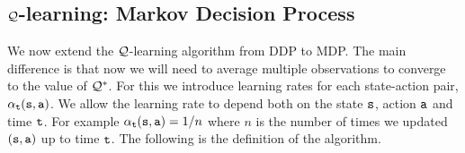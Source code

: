 \subsection{$\mathcal{Q}$-learning: Markov Decision Process}


We now extend the $\mathcal{Q}$-learning algorithm from DDP to MDP. The main
difference is that now we will need to average multiple observations
to converge to the value of $\mathcal{Q}^*$. For this we introduce
learning rates for each state-action pair, $\alpha_{\tt t}({\tt s},{\tt a})$. We allow the
learning rate to depend both on the state ${\tt s}$, action ${\tt a}$
and time ${\tt t}$. For example $\alpha_{\tt t}({\tt s},{\tt a})=1/n$
where $n$ is the number of times we updated $({\tt s},{\tt a})$ up to
time ${\tt t}$. The following is the definition of the algorithm.







